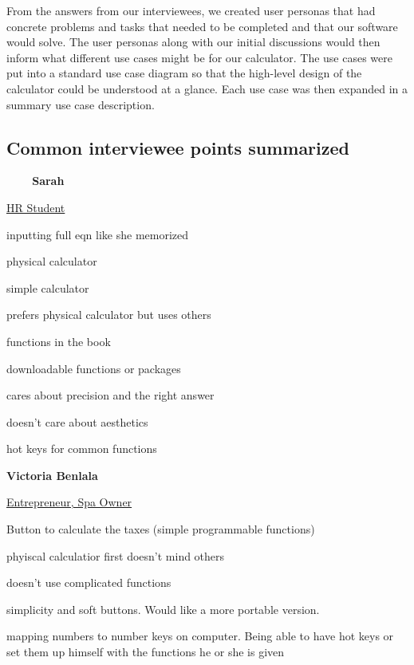 \documentclass[a4paper]{article}
\begin{document}
From the answers from our interviewees, we created user personas that had concrete problems and tasks that needed to be completed and that our software would solve. The user personas along with our initial discussions would then inform what different use cases might be for our calculator. The use cases were put into a standard use case diagram so that the high-level design of the calculator could be understood at a glance. Each use case was then expanded in a summary use case description.

\subsection{Common interviewee points summarized}

\textbf{\ \ \ \  Sarah}

\underline{HR Student}

\begin{compactitem}
\item inputting full eqn like she memorized
\item physical calculator 
\item simple calculator
\item prefers physical calculator but uses others
\item functions in the book
\item downloadable functions or packages
\item cares about precision and the right answer
\item doesn’t care about aesthetics
\item hot keys for common functions
\end{compactitem}
\bigskip

\textbf{Victoria  Benlala}

\underline{Entrepreneur, Spa Owner}

\begin{compactitem}
\item Button to calculate the taxes (simple programmable functions)
\item phyiscal calculatior first doesn’t mind others
\item doesn’t use complicated functions
\item simplicity and soft buttons. Would like a more portable version.
\item mapping numbers to number keys on computer. Being able to have hot keys or set them up himself with the functions he or she is given
\end{compactitem}
\bigskip
\end{document}
